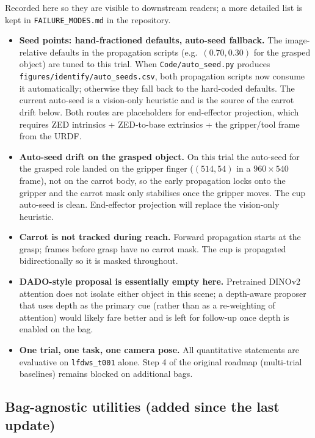 \documentclass[11pt]{article}
\begin{document}
Recorded here so they are visible to downstream readers; a more detailed list
is kept in \texttt{FAILURE\_MODES.md} in the repository.

\begin{itemize}[noitemsep]
  \item \textbf{Seed points: hand-fractioned defaults, auto-seed fallback.}
        The image-relative defaults in the propagation scripts (e.g.\
        $(0.70, 0.30)$ for the grasped object) are tuned to this trial.
        When \texttt{Code/auto\_seed.py} produces
        \texttt{figures/identify/\allowbreak auto\_seeds.csv}, both
        propagation scripts now consume it automatically; otherwise they
        fall back to the hard-coded defaults. The current auto-seed is a
        vision-only heuristic and is the source of the carrot drift below.
        Both routes are placeholders for end-effector projection, which
        requires ZED intrinsics + ZED-to-base extrinsics + the gripper/tool
        frame from the URDF.
  \item \textbf{Auto-seed drift on the grasped object.} On this trial the
        auto-seed for the grasped role landed on the gripper finger
        ($(514, 54)$ in a $960\times540$ frame), not on the carrot body, so
        the early propagation locks onto the gripper and the carrot mask
        only stabilises once the gripper moves. The cup auto-seed is clean.
        End-effector projection will replace the vision-only heuristic.
  \item \textbf{Carrot is not tracked during reach.} Forward propagation
        starts at the grasp; frames before grasp have no carrot mask. The
        cup is propagated bidirectionally so it is masked throughout.
  \item \textbf{DADO-style proposal is essentially empty here.} Pretrained
        DINOv2 attention does not isolate either object in this scene; a
        depth-aware proposer that uses depth as the primary cue (rather than
        as a re-weighting of attention) would likely fare better and is left
        for follow-up once depth is enabled on the bag.
  \item \textbf{One trial, one task, one camera pose.} All quantitative
        statements are evaluative on \texttt{lfdws\_t001} alone. Step 4
        of the original roadmap (multi-trial baselines) remains blocked on
        additional bags.
\end{itemize}

\subsection{Bag-agnostic utilities (added since the last update)}
\end{document}
